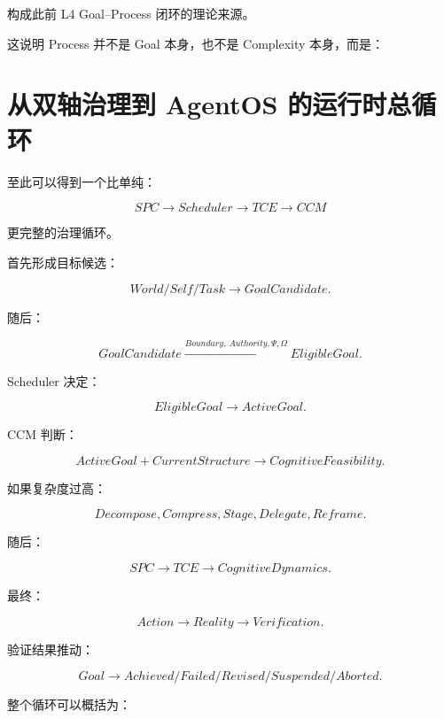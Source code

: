 构成此前 L4 Goal--Process 闭环的理论来源。

这说明 Process 并不是 Goal 本身，也不是 Complexity 本身，而是：

\begin{statementbox}
\centering
{}
\end{statementbox}


\section{从双轴治理到 AgentOS 的运行时总循环}

至此可以得到一个比单纯：

\[
SPC
\rightarrow
Scheduler
\rightarrow
TCE
\rightarrow
CCM
\]

更完整的治理循环。

首先形成目标候选：

\[
World/Self/Task
\rightarrow
GoalCandidate.
\]

随后：

\[
GoalCandidate
\xrightarrow{
Boundary,\ Authority,\Psi,\Omega
}
EligibleGoal.
\]

Scheduler 决定：

\[
EligibleGoal
\rightarrow
ActiveGoal.
\]

CCM 判断：

\[
ActiveGoal
+
CurrentStructure
\rightarrow
CognitiveFeasibility.
\]

如果复杂度过高：

\[
Decompose,
Compress,
Stage,
Delegate,
Reframe.
\]

随后：

\[
SPC
\rightarrow
TCE
\rightarrow
CognitiveDynamics.
\]

最终：

\[
Action
\rightarrow
Reality
\rightarrow
Verification.
\]

验证结果推动：

\[
Goal
\rightarrow
Achieved/Failed/Revised/Suspended/Aborted.
\]

整个循环可以概括为：

\begin{statementbox}
\centering
{}
\end{statementbox}


